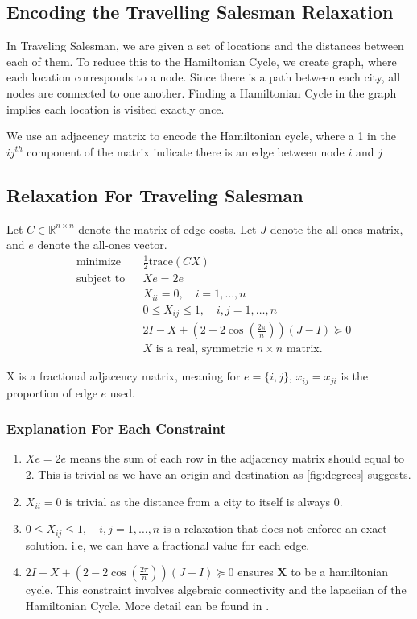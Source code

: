 \documentclass{article}
\begin{document}
\subsection{Encoding the Travelling Salesman Relaxation}

In Traveling Salesman, we are given a set of locations and the distances between each of them.
To reduce this to the Hamiltonian Cycle, we create graph, where each location corresponds to a node. 
Since there is a path between each city, all nodes are connected to one another. 
Finding a Hamiltonian Cycle in the graph implies each location is visited exactly once.

We use an adjacency matrix to encode the Hamiltonian cycle, 
where a 1 in the $ij^{th}$ component of the matrix indicate there is an edge between node $i$ and $j$
\subsection{Relaxation For Traveling Salesman}


Let $C \in \mathbb{R}^{n \times n}$ denote the matrix of edge costs. Let $J$ denote the all-ones matrix, and $e$ denote the all-ones vector.
\begin{equation*}
\begin{aligned}
& {\text{minimize}}
& & \frac{1}{2}\text{trace}(CX) \\
& \text{subject to}
& & Xe = 2e \\
&&& X_{ii} = 0, \quad i = 1,\ldots,n\\
&&& 0 \leq X_{ij} \leq 1, \quad i,j = 1,\ldots,n \\
&&& 2I - X + (2-2\cos\left(\frac{2\pi}{n}\right))(J-I) \succeq 0 \\
&&& X \text{ is a real, symmetric } n \times n \text{ matrix}.
\end{aligned}
\end{equation*}

\noindent X is a fractional adjacency matrix, meaning for $e = \{i, j\}$, $x_{ij} = x_{ji}$ is the proportion of edge $e$ used.
\subsubsection{Explanation For Each Constraint}
\begin{enumerate}
    \item $Xe = 2e$ means the sum of each row in the adjacency matrix should equal to 2. This is trivial as we have an origin and destination as \ref{fig:degrees} suggests. 
    \item $X_{ii} = 0$ is trivial as the distance from a city to itself is always 0.
    \item $0 \leq X_{ij} \leq 1, \quad i,j = 1,\ldots,n$ is a relaxation that does not enforce an exact solution. i.e, we can have a fractional value for each edge.
    \item $2I - X + (2-2\cos\left(\frac{2\pi}{n}\right))(J-I) \succeq 0$ ensures $\mathbf{X}$ to be a hamiltonian cycle. This constraint involves algebraic connectivity and 
    the lapaciian of the Hamiltonian Cycle. More detail can be found in \cite{Dragos}. 
\end{enumerate}
\end{document}
